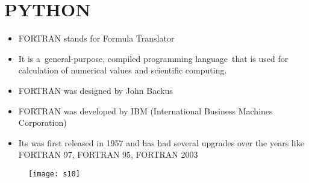 \documentclass{article}
\begin{document}
	\section{PYTHON}
	\begin{itemize}
		\item FORTRAN stands for Formula Translator
		\item It is a general-purpose, compiled programming language that is used for calculation  of numerical values  and scientific computing.
		\item FORTRAN was designed by John Backus 
		\item FORTRAN was developed  by IBM (International Business Machines Corporation)
		\item Its was first released in 1957 and has had  several upgrades over the  years  like FORTRAN 97, FORTRAN 95, FORTRAN 2003 
	\end{itemize}
\begin{figure}
	\texttt{[image: s10]}
	\caption{}
	\label{fig:s10}
\end{figure}

	
	
\end{document}
